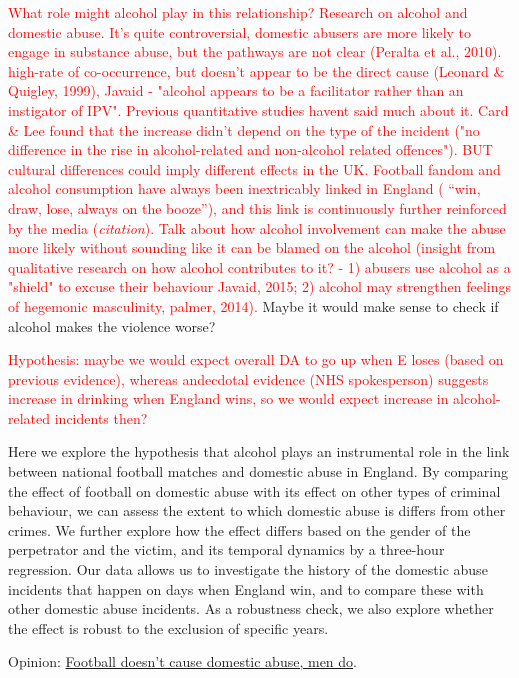 \documentclass[12pt, letterpaper]{article}
\begin{document}
\textcolor{red}{What role might alcohol play in this relationship? Research on alcohol and domestic abuse. It's quite controversial, domestic abusers are more likely to engage in substance abuse, but the pathways are not clear (Peralta et al., 2010). high-rate of co-occurrence, but doesn't appear to be the direct cause (Leonard \& Quigley, 1999), Javaid - "alcohol appears to be a facilitator rather than an instigator of IPV".  Previous quantitative studies havent said much about it. Card \& Lee found that the increase didn't depend on the type of the incident ("no difference in the rise in alcohol-related and non-alcohol related offences"). BUT cultural differences could imply different effects in the UK. Football fandom and alcohol consumption have always been inextricably linked in England ( “win, draw, lose, always on the booze”), and this link is continuously further reinforced by the media (\textit{citation}). Talk about how alcohol involvement can make the abuse more likely without sounding like it can be blamed on the alcohol (insight from qualitative research on how alcohol contributes to it? - 1) abusers use alcohol as a "shield" to excuse their behaviour Javaid, 2015; 2) alcohol may strengthen feelings of hegemonic masculinity, palmer, 2014).} Maybe it would make sense to check if alcohol makes the violence worse?

\textcolor{red}{Hypothesis: maybe we would expect overall DA to go up when E loses (based on previous evidence), whereas andecdotal evidence (NHS spokesperson) suggests increase in drinking when England wins, so we would expect increase in alcohol-related incidents then?}

Here we explore the hypothesis that alcohol plays an instrumental role in the link between national football matches and domestic abuse in England. By comparing the effect of football on domestic abuse with its effect on other types of criminal behaviour, we can assess the extent to which domestic abuse is differs from other crimes. We further explore how the effect differs based on the gender of the perpetrator and the victim, and its temporal dynamics by a three-hour regression. Our data allows us to investigate the history of the domestic abuse incidents that happen on days when England win, and to compare these with other domestic abuse incidents. As a robustness check, we also explore whether the effect is robust to the exclusion of specific years. 

Opinion: \href{https://www.heraldscotland.com/opinion/14432673.football-doesnt-cause-domestic-abuse-men-do/}{Football doesn't cause domestic abuse, men do}.
\end{document}
